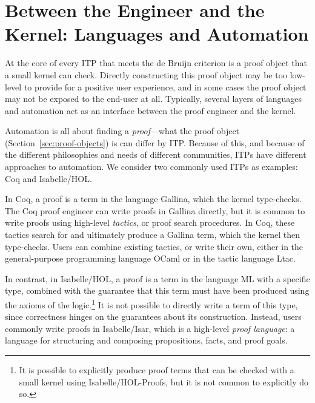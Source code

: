 \chapter[Between the Engineer and the Kernel: Languages and\\ Automation]{Between the Engineer and the Kernel: Languages and Automation}
\label{sec:prooflangs}

At the core of every ITP that meets the de Bruijn criterion
is a proof object that a small kernel can check. Directly constructing this proof object
may be too low-level to provide for a positive user experience, and in some cases the proof object may not
be exposed to the end-user at all. Typically, several layers of languages and automation
act as an interface between the proof engineer and the kernel.


Automation is all about finding a \textit{proof}---what the proof object (Section~\ref{sec:proof-objects}) is can differ by ITP.
Because of this, and because of the different philosophies and needs of different communities,
ITPs have different approaches to automation.
We consider two commonly used ITPs as examples: Coq and Isabelle/HOL.

In Coq, a proof is a term in the language Gallina, which the kernel type-checks.
The Coq proof engineer can write proofs in Gallina directly, but it is common
to write proofs using high-level \textit{tactics}, or proof search procedures. 
In Coq, these tactics search for and ultimately produce a Gallina term, which the kernel then type-checks.
Users can combine existing tactics, or write their own, either in the general-purpose programming language
OCaml or in the tactic language Ltac. 

In contrast, in Isabelle/HOL, a proof is a term in the language ML with
a specific type, combined with the guarantee that this term must have been
produced using the axioms of the logic.\footnote{It is possible to explicitly produce proof terms that can be checked
with a small kernel using Isabelle/HOL-Proofs, but it is not common to explicitly do so.}
It is not possible to directly write a term of this type, since correctness hinges on the guarantees
about its construction. Instead, users commonly write proofs in Isabelle/Isar, which is a high-level \textit{proof language}:
a language for structuring and composing propositions, facts, and proof goals. 

